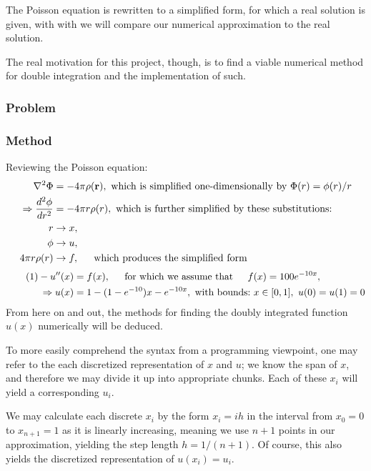\documentclass[11pt,a4paper,notitlepage]{article}
\begin{document}
The Poisson equation is rewritten to a simplified form, for which a real solution is given, with with we will compare our numerical approximation to the real solution.

The real motivation for this project, though, is to find a viable numerical method for double integration and the implementation of such.

\subsubsection{Problem}

\subsubsection{Method}
Reviewing the Poisson equation:
\begin{align*}
\nabla ^2 \Phi &= -4\pi\rho(\mathbf{r}), \ \text{which is simplified one-dimensionally by} \ \Phi(r) = \phi(r)/r \\
\Rightarrow \frac{d^2 \phi}{dr^2} &= -4\pi r \rho(r), \ \text{which is further simplified by these substitutions:}\\
r &\rightarrow x, \\
\phi &\rightarrow u,\\
4\pi r\rho(r) &\rightarrow f, \indent \text{which produces the simplified form}
\end{align*}
\begin{align*}\label{eq:1}\tag{1}
-u''(x) &= f(x), \indent \text{for which we assume that} \indent f(x) = 100e^{-10x}, \\
\Rightarrow u(x) &= 1- (1-e^{-10})x - e^{-10x},\ \text{with bounds:}\ x \in [0,1],\ u(0) = u(1)= 0
\end{align*}
From here on and out, the methods for finding the doubly integrated function $u(x)$ numerically will be deduced.

To more easily comprehend the syntax from a programming viewpoint, one may refer to the each discretized representation of $x$ and $u$; we know the span of $x$, and therefore we may divide it up into appropriate chunks. Each of these $x_i$ will yield a corresponding $u_i$.

We may calculate each discrete $x_i$ by the form $x_i = ih$ in the interval from $x_0 = 0$ to $x_{n+1} = 1$ as it is linearly increasing, meaning we use $n+1$ points in our approximation, yielding the step length $h = 1/(n+1)$. Of course, this also yields the discretized representation of $u(x_i) = u_i$.
\end{document}

